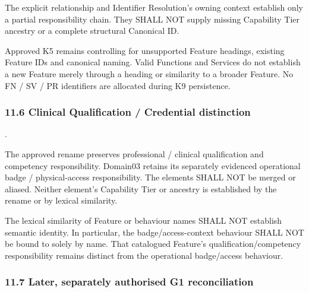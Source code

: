 The explicit \texttt{} relationship and Identifier Resolution's owning context establish only a partial responsibility chain. They SHALL NOT supply missing Capability Tier ancestry or a complete structural Canonical ID.

\label{rad:k9:1459}

Approved K5 remains controlling for unsupported Feature headings, existing Feature IDs and canonical naming. Valid Functions and Services do not establish a new Feature merely through a heading or similarity to a broader Feature. No FN /\allowbreak{} SV /\allowbreak{} PR identifiers are allocated during K9 persistence.

\label{rad:k9:1461}
\subsubsection*{11.6 Clinical Qualification /\allowbreak{} Credential distinction}
\label{rad:k9:1463}

\texttt{}.

\label{rad:k9:1465}

The approved rename \texttt{} preserves professional /\allowbreak{} clinical qualification and competency responsibility. Domain03 \texttt{} retains its separately evidenced operational badge /\allowbreak{} physical-access responsibility. The elements SHALL NOT be merged or aliased. Neither element's Capability Tier or ancestry is established by the rename or by lexical similarity.

\label{rad:k9:1467}

The lexical similarity of Feature or behaviour names SHALL NOT establish semantic identity. In particular, the badge/\allowbreak{}access-context \texttt{} behaviour SHALL NOT be bound to \texttt{} solely by name. That catalogued Feature's qualification/\allowbreak{}competency responsibility remains distinct from the operational badge/\allowbreak{}access behaviour.

\label{rad:k9:1469}
\subsubsection*{11.7 Later, separately authorised G1 reconciliation}
\label{rad:k9:1471}

